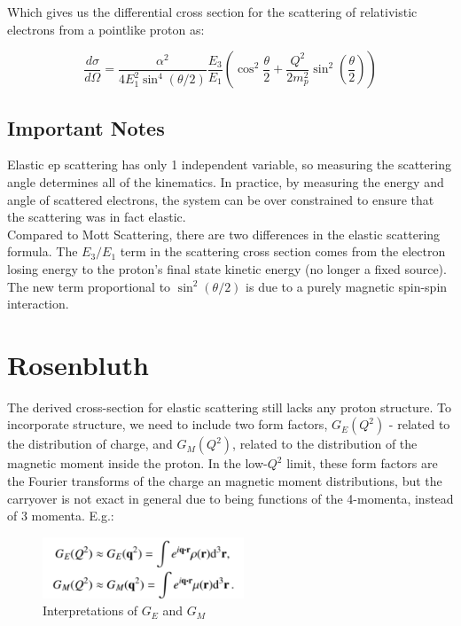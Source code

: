         Which gives us the differential cross section for the scattering of relativistic electrons from a pointlike proton as: 
        
        \begin{equation}
            \frac{d\sigma}{d\Omega} = \frac{\alpha^2}{4E_1^2\sin^4{(\theta/2)}}\frac{E_3}{E_1}(\cos^2{\frac{\theta}{2}}+\frac{Q^2}{2m_p^2}\sin^2(\frac{\theta}{2}))
        \end{equation}
        
        \subsection{Important Notes}
            \indent Elastic ep scattering has only 1 independent variable, so measuring the scattering angle determines all of the kinematics. In practice, by measuring the energy and angle of scattered electrons, the system can be over constrained to ensure that the scattering was in fact elastic. \\

            \indent Compared to Mott Scattering, there are two differences in the elastic scattering formula. The $E_3/E_1$ term in the scattering cross section comes from the electron losing energy to the proton's final state kinetic energy (no longer a fixed source). The new term proportional to $\sin^2(\theta/2)$ is due to a purely magnetic spin-spin interaction. 
    \section{Rosenbluth}
        \indent The derived cross-section for elastic scattering still lacks any proton structure. To incorporate structure, we need to include two form factors, $G_E(Q^2)$ - related to the distribution of charge, and $G_M(Q^2)$, related to the distribution of the magnetic moment inside the proton. In the low-$Q^2$ limit, these form factors are the Fourier transforms of the charge an magnetic moment distributions, but the carryover is not exact in general due to being functions of the 4-momenta, instead of 3 momenta. E.g.:
        
        \begin{figure}[H]
            \centering
            \includegraphics[width=6cm]{NuclearPhysics/modules/lepton-scattering/pics/elastic-ep/fourier-gegm.PNG}
            \caption{Interpretations of $G_E$ and $G_M$}
        \end{figure}
        
